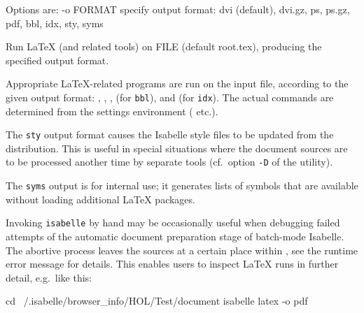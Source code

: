 \begin{isabellebody}
\begin{isamarkuptext}
\begin{ttbox}
  Options are:
    -o FORMAT    specify output format: dvi (default), dvi.gz, ps,
                 ps.gz, pdf, bbl, idx, sty, syms

  Run LaTeX (and related tools) on FILE (default root.tex),
  producing the specified output format.
\end{ttbox}

  Appropriate {\LaTeX}-related programs are run on the input file,
  according to the given output format: \hyperlink{executable.latex}{\mbox{}},
  \hyperlink{executable.pdflatex}{\mbox{}}, \hyperlink{executable.dvips}{\mbox{}}, \hyperlink{executable.bibtex}{\mbox{}}
  (for \verb|bbl|), and \hyperlink{executable.makeindex}{\mbox{}} (for \verb|idx|).  The actual commands are determined from the settings
  environment (\hyperlink{setting.ISABELLE-LATEX}{\mbox{}} etc.).

  The \verb|sty| output format causes the Isabelle style files to
  be updated from the distribution.  This is useful in special
  situations where the document sources are to be processed another
  time by separate tools (cf.\ option \verb|-D| of the \hyperlink{tool.usedir}{\mbox{}} utility).

  The \verb|syms| output is for internal use; it generates lists
  of symbols that are available without loading additional {\LaTeX}
  packages.%
\end{isamarkuptext}%
\isamarkuptrue%
%
\isamarkuptrue%
%
\begin{isamarkuptext}%
Invoking \verb|isabelle| \hyperlink{tool.latex}{\mbox{}} by hand may be
  occasionally useful when debugging failed attempts of the automatic
  document preparation stage of batch-mode Isabelle.  The abortive
  process leaves the sources at a certain place within \hyperlink{setting.ISABELLE-BROWSER-INFO}{\mbox{}}, see the runtime error message for details.
  This enables users to inspect {\LaTeX} runs in further detail, e.g.\
  like this:
\begin{ttbox}
  cd ~/.isabelle/browser_info/HOL/Test/document
  isabelle latex -o pdf
\end{ttbox}%
\end{isamarkuptext}%
\isamarkuptrue%
%
\isadelimtheory
%
\endisadelimtheory
%
\isatagtheory
{}\isamarkupfalse%
%
\endisatagtheory
{\isafoldtheory}%
%
\isadelimtheory
%
\endisadelimtheory
\end{isabellebody}%
